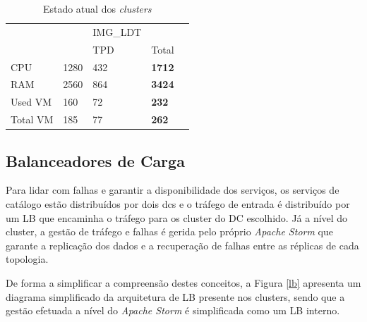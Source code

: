 \begin{table}[H]
\begin{tabular}{|l|l|l|l|l|}
    &                                                       & \cellcolor[HTML]{BDD7EE}IMG\_LDT                       &                            \\ \cline{1-4} 
    &                                                       & \cellcolor[HTML]{BDD7EE}TPD                           & Total                      \\ \cline{1-4}
    \cellcolor[HTML]{C0C0C0}CPU                             & 1280                                                     & 432                                                     & \textbf{1712}                 \\ \cline{1-4}
    \cellcolor[HTML]{C0C0C0}RAM                             & 2560                                                    & 864                                                     & \textbf{3424}                \\ \cline{1-4}
    \cellcolor[HTML]{C0C0C0}Used VM                         & 160                                                     & 72                                                      & \textbf{232}                 \\ \cline{1-4}
    \cellcolor[HTML]{C0C0C0}Total VM                        & 185                                                     & 77                                                      & \textbf{262}                 \\ \cline{1-4}
  \end{tabular}
  \caption{Estado atual dos \textit{clusters}}
  \label{tab:current_setup}
\end{table}

\subsection{Balanceadores de Carga}

Para lidar com falhas e garantir a disponibilidade dos serviços, os serviços de catálogo estão
distribuídos por dois \glspl{dc} e o tráfego de entrada é distribuído por um \ac{LB} que encaminha
o tráfego para os \gls{cluster} do \ac{DC} escolhido. Já a nível do \gls{cluster}, a gestão de 
tráfego e falhas é gerida pelo próprio \textit{Apache Storm} que garante a replicação dos dados
e a recuperação de falhas entre as réplicas de cada topologia.

De forma a simplificar a compreensão destes conceitos, a Figura \ref{lb} apresenta um diagrama
simplificado da arquitetura de \ac{LB} presente nos \glspl{cluster}, sendo que a gestão efetuada
a nível do \textit{Apache Storm} é simplificada como um \ac{LB} interno.

